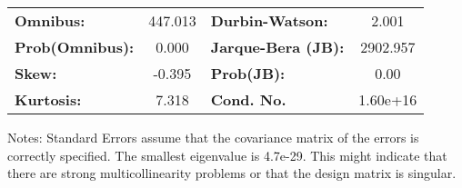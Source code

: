\begin{center}
\begin{tabular}{lcccccc}
\bottomrule
\end{tabular}
\begin{tabular}{lclc}
\textbf{Omnibus:}       & 447.013 & \textbf{  Durbin-Watson:     } &    2.001  \\
\textbf{Prob(Omnibus):} &   0.000 & \textbf{  Jarque-Bera (JB):  } & 2902.957  \\
\textbf{Skew:}          &  -0.395 & \textbf{  Prob(JB):          } &     0.00  \\
\textbf{Kurtosis:}      &   7.318 & \textbf{  Cond. No.          } & 1.60e+16  \\
\bottomrule
\end{tabular}
\end{center}

Notes: \newline
 [1] Standard Errors assume that the covariance matrix of the errors is correctly specified. \newline
 [2] The smallest eigenvalue is 4.7e-29. This might indicate that there are \newline
 strong multicollinearity problems or that the design matrix is singular.